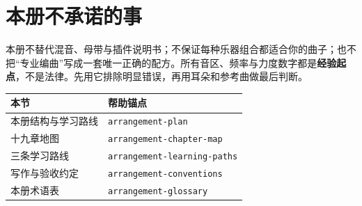 \section*{本册不承诺的事}

本册不替代混音、母带与插件说明书；不保证每种乐器组合都适合你的曲子；也不把“专业编曲”写成一套唯一正确的配方。所有音区、频率与力度数字都是\textbf{经验起点}，不是法律。先用它排除明显错误，再用耳朵和参考曲做最后判断。

\begin{helpmapping}
\begin{longtable}{p{}p{}}
\toprule
本节 & 帮助锚点 \\
\midrule
本册结构与学习路线 & \texttt{arrangement-plan} \\
十九章地图 & \texttt{arrangement-chapter-map} \\
三条学习路线 & \texttt{arrangement-learning-paths} \\
写作与验收约定 & \texttt{arrangement-conventions} \\
本册术语表 & \texttt{arrangement-glossary} \\
\bottomrule
\end{longtable}
\end{helpmapping}
